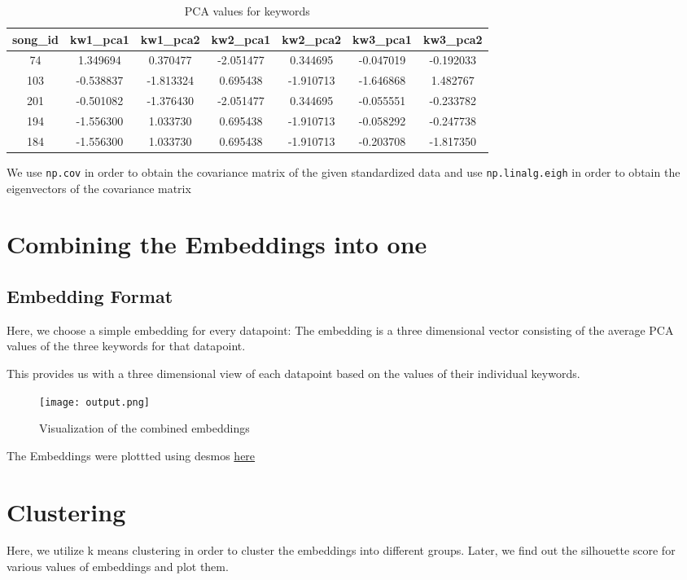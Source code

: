 \documentclass{article}
\begin{document}
\cite{pca_gfg}
\begin{table}[h]
    \centering
    \begin{tabular}{|c|c|c|c|c|c|c|}
        \hline
        \textbf{song\_id} & \textbf{kw1\_pca1} & \textbf{kw1\_pca2} & \textbf{kw2\_pca1} & \textbf{kw2\_pca2} & \textbf{kw3\_pca1} & \textbf{kw3\_pca2} \\
        \hline
        74 & 1.349694 & 0.370477 & -2.051477 & 0.344695 & -0.047019 & -0.192033 \\
        103 & -0.538837 & -1.813324 & 0.695438 & -1.910713 & -1.646868 & 1.482767 \\
        201 & -0.501082 & -1.376430 & -2.051477 & 0.344695 & -0.055551 & -0.233782 \\
        194 & -1.556300 & 1.033730 & 0.695438 & -1.910713 & -0.058292 & -0.247738 \\
        184 & -1.556300 & 1.033730 & 0.695438 & -1.910713 & -0.203708 & -1.817350 \\
        \hline
    \end{tabular}
    \caption{PCA values for keywords}
    \label{tab:pca_values}
\end{table}
We use \texttt{np.cov} in order to obtain the covariance matrix of the given standardized data and use \texttt{np.linalg.eigh} in order to obtain the eigenvectors of the covariance matrix

\section{Combining the Embeddings into one}
\subsection{Embedding Format}
Here, we choose a simple embedding for every datapoint: The embedding is a three dimensional vector consisting of the average PCA values of the three keywords for that datapoint.

This provides us with a three dimensional view of each datapoint based on the values of their individual keywords.
\begin{figure}[h]
\centering
\texttt{[image: output.png]}
\caption{Visualization of the combined embeddings}
\label{fig:combined_embeddings}
\end{figure}

The Embeddings were plottted using desmos \href{https://www.desmos.com/3d/ui3zwls4ck}{here}

\section{Clustering}
Here, we utilize k means clustering in order to cluster the embeddings into different groups. Later, we find out the silhouette score for various values of embeddings and plot them.
\end{document}
